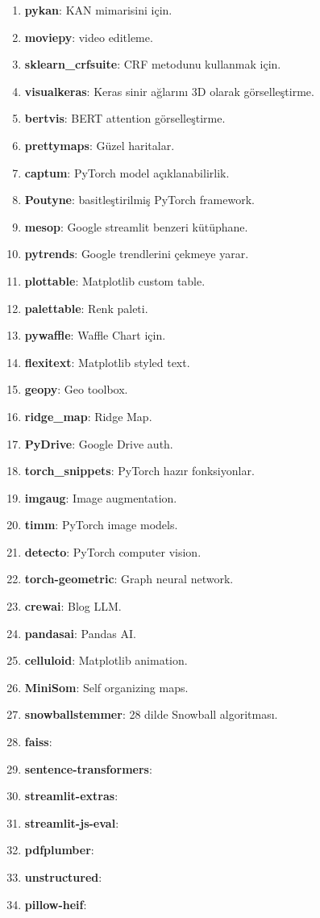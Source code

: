 \begin{enumerate}
    \item \textbf{pykan}: KAN mimarisini için.
    \item \textbf{moviepy}: video editleme.
    \item \textbf{sklearn\_crfsuite}: CRF metodunu kullanmak için.
    \item \textbf{visualkeras}: Keras sinir ağlarını 3D olarak görselleştirme.
    \item \textbf{bertvis}: BERT attention görselleştirme.
    \item \textbf{prettymaps}: Güzel haritalar.
    \item \textbf{captum}: PyTorch model açıklanabilirlik.
    \item \textbf{Poutyne}: basitleştirilmiş PyTorch framework.
    \item \textbf{mesop}: Google streamlit benzeri kütüphane.
    \item \textbf{pytrends}: Google trendlerini çekmeye yarar.
    \item \textbf{plottable}: Matplotlib custom table.
    \item \textbf{palettable}: Renk paleti.
    \item \textbf{pywaffle}: Waffle Chart için.
    \item \textbf{flexitext}: Matplotlib styled text.
    \item \textbf{geopy}: Geo toolbox.
    \item \textbf{ridge\_map}: Ridge Map.
    \item \textbf{PyDrive}: Google Drive auth.
    \item \textbf{torch\_snippets}: PyTorch hazır fonksiyonlar.
    \item \textbf{imgaug}: Image augmentation.
    \item \textbf{timm}: PyTorch image models.
    \item \textbf{detecto}: PyTorch computer vision.
    \item \textbf{torch-geometric}: Graph neural network.
    \item \textbf{crewai}: Blog LLM.
    \item \textbf{pandasai}: Pandas AI.
    \item \textbf{celluloid}: Matplotlib animation.
    \item \textbf{MiniSom}: Self organizing maps.
    \item \textbf{snowballstemmer}: 28 dilde Snowball algoritması.
    \item \textbf{faiss}:
    \item \textbf{sentence-transformers}:
    \item \textbf{streamlit-extras}:
    \item \textbf{streamlit-js-eval}:
    \item \textbf{pdfplumber}:
    \item \textbf{unstructured}:
    \item \textbf{pillow-heif}:
\end{enumerate}


